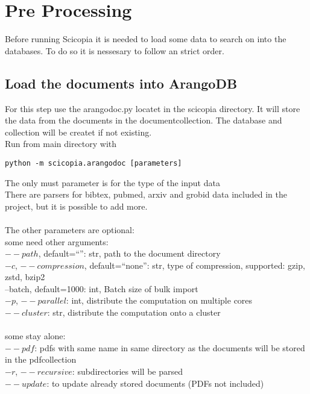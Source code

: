 \section{Pre Processing}\label{prepros}
Before running Scicopia it is needed to load some data to search on into the databases. To do so it is nessesary to follow an strict order.

\subsection{Load the documents into ArangoDB}
For this step use the arangodoc.py locatet in the scicopia directory. It will store the data from the documents in the documentcollection. The database and collection will be createt if not existing.\\
Run from main directory with 
\begin{verbatim}
python -m scicopia.arangodoc [parameters]
\end{verbatim}
The only must parameter is for the type of the input data\\
There are parsers for bibtex, pubmed, arxiv and grobid data included in the project, but it is possible to add more.\\\\
The other parameters are optional:\\
some need other arguments:\\
$--path$, default=``'': str, path to the document directory\\
$-c$, $--compression$, default=``none'': str, type of compression, supported: gzip, zstd, bzip2\\
--batch, default=1000: int, Batch size of bulk import\\
$-p$, $--parallel$: int, distribute the computation on multiple cores\\
$--cluster$: str, distribute the computation onto a cluster\\
\\
some stay alone:\\
$--pdf$: pdfs with same name in same directory as the documents will be stored in the pdfcollection\\
$-r$, $--recursive$: subdirectories will be parsed\\
$--update$: to update already stored documents (PDFs not included)\\

